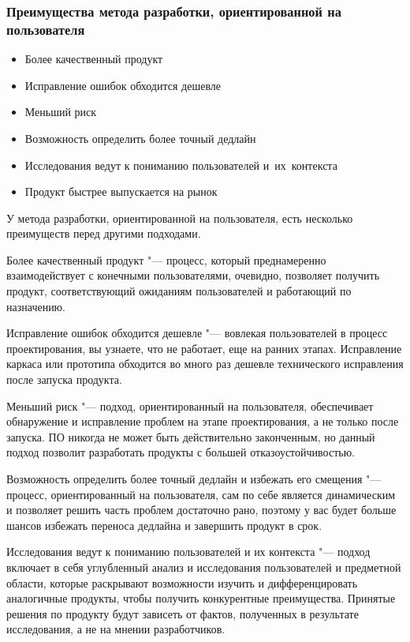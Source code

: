 \documentclass{../industrial-development}
\begin{document}
\begin{frame} \frametitle{Преимущества метода разработки, ориентированной на пользователя}
  \begin{itemize}
   \item Более качественный продукт
   \item Исправление ошибок обходится дешевле
   \item Меньший риск
   \item Возможность определить более точный дедлайн
   \item Исследования ведут к пониманию пользователей и~их~контекста
   \item Продукт быстрее выпускается на рынок
  \end{itemize}
\end{frame}

\lecturenotes

У метода разработки, ориентированной на пользователя, есть несколько преимуществ перед другими подходами.

Более качественный продукт "--- процесс, который преднамеренно взаимодействует с конечными пользователями, очевидно, позволяет получить продукт, соответствующий ожиданиям пользователей и работающий по назначению.

Исправление ошибок обходится дешевле "--- вовлекая пользователей в процесс проектирования, вы узнаете, что не работает, еще на ранних этапах. Исправление каркаса или прототипа обходится во много раз дешевле технического исправления после запуска продукта.

Меньший риск "--- подход, ориентированный на пользователя, обеспечивает обнаружение и исправление проблем на этапе проектирования, а не только после запуска. ПО никогда не может быть действительно законченным, но данный подход позволит разработать продукты с большей отказоустойчивостью.

Возможность определить более точный дедлайн и избежать его смещения "--- процесс, ориентированный на пользователя, сам по себе является динамическим и позволяет решить часть проблем достаточно рано, поэтому у вас будет больше шансов избежать переноса дедлайна и завершить продукт в срок.

Исследования ведут к пониманию пользователей и их контекста "--- подход включает в себя углубленный анализ и исследования пользователей и предметной области, которые раскрывают возможности изучить и дифференцировать аналогичные продукты, чтобы получить конкурентные преимущества. Принятые решения по продукту будут зависеть от фактов, полученных в результате исследования, а не на мнении разработчиков.
\end{document}
